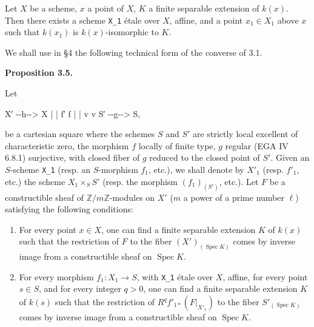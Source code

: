 \documentclass[
  11pt,
  a4paper,
]{book}
\newenvironment{Shaded}{}{}
\newcommand{\NormalTok}[1]{#1}
\begin{document}
Let \(X\) be a scheme, \(x\) a point of \(X\), \(K\) a finite separable
extension of \(k(x)\). Then there exists a scheme \texttt{X\_1} étale
over \(X\), affine, and a point \(x_{1} \in X_{1}\) above \(x\) such
that \(k(x_{1})\) is \(k(x)\)-isomorphic to \(K\).

We shall use in §4 the following technical form of the converse of 3.1.

\textbf{Proposition 3.5.}

Let

\begin{Shaded}
\begin{Highlighting}[]
\NormalTok{X′ {-}{-}h{-}{-}\textgreater{} X}
\NormalTok{|         |}
\NormalTok{f′        f}
\NormalTok{|         |}
\NormalTok{v         v}
\NormalTok{S′ {-}{-}g{-}{-}\textgreater{} S,}
\end{Highlighting}
\end{Shaded}

be a cartesian square where the schemes \(S\) and \(S'\) are strictly
local excellent of characteristic zero, the morphism \(f\) locally of
finite type, \(g\) regular (EGA IV 6.8.1) surjective, with closed fiber
of \(g\) reduced to the closed point of \(S'\). Given an \(S\)-scheme
\texttt{X\_1} (resp. an \(S\)-morphism \(f_{1}\), etc.), we shall denote
by \(X'_{1}\) (resp. \(f'_{1}\), etc.) the scheme
\(X_{1} \times_{S} S'\) (resp. the morphism \((f_{1})_{(S')}\), etc.).
Let \(F\) be a constructible sheaf of \(\mathbb{Z}/m\mathbb{Z}\)-modules
on \(X'\) (\(m\) a power of a prime number \(\ell\)) satisfying the
following conditions:

\begin{enumerate}
\def\labelenumi{(\roman{enumi})}
\item
  For every point \(x \in X\), one can find a finite separable extension
  \(K\) of \(k(x)\) such that the restriction of \(F\) to the fiber
  \((X')_{(\operatorname{Spec} K)}\) comes by inverse image from a
  constructible sheaf on \(\operatorname{Spec}
  K\).
\item
  For every morphism \(f_{1} : X_{1} \to S\), with \texttt{X\_1} étale
  over \(X\), affine, for every point \(s \in S\), and for every integer
  \(q > 0\), one can find a finite separable extension \(K\) of \(k(s)\)
  such that the restriction of \(R^{q}
  f'_{1*}(F|_{X'_{1}})\) to the fiber \(S'_{(\operatorname{Spec} K)}\)
  comes by inverse image from a constructible sheaf on
  \(\operatorname{Spec} K\).
\end{enumerate}
\end{document}
